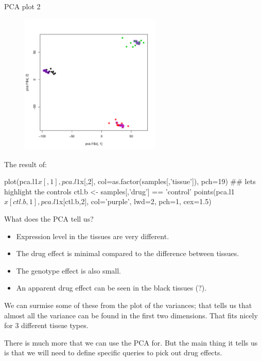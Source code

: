 \documentclass[pdf]{beamer}
\begin{document}
\begin{frame}[fragile]{PCA plot 2}
  \begin{figure}[ht]
    \includegraphics[width=0.6\textwidth]{images/pca2}
  \end{figure}
  \vspace{-4em}
  The result of:
  \begin{rcode}
  plot(pca.l1$x[,1], pca.l1$x[,2], col=as.factor(samples[,'tissue']), pch=19)
  ## lets highlight the controls
  ctl.b <- samples[,'drug'] == 'control'
  points(pca.l1$x[ctl.b,1], pca.l1$x[ctl.b,2], col='purple', lwd=2, pch=1, cex=1.5)
  \end{rcode}
\end{frame}

\begin{frame}{What does the PCA tell us?}
  \begin{itemize}
  \item Expression level in the tissues are very different.
  \item The drug effect is minimal compared to the difference between tissues.
  \item The genotype effect is also small.
  \item An apparent drug effect can be seen in the black tissues (?).
  \end{itemize}
  
  We can surmise some of these from the plot of the variances; that tells us that
  almost all the variance can be found in the first two dimensions. That fits nicely
  for 3 different tissue types.

  There is much more that we can use the PCA for. But the main thing it tells us is
  that we will need to define specific queries to pick out drug effects.
  
\end{frame}
\end{document}
